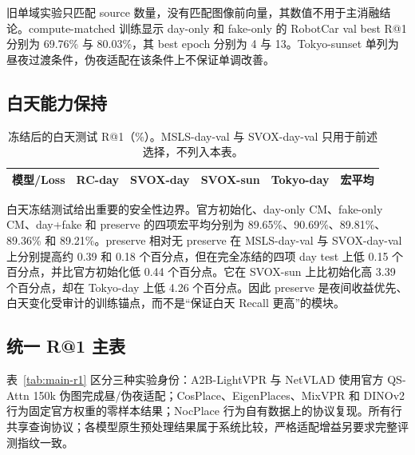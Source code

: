 \documentclass[UTF8,a4paper,11pt]{ctexart}
\begin{document}
旧单域实验只匹配 source 数量，没有匹配图像前向量，其数值不用于主消融结论。compute-matched 训练显示 day-only 和 fake-only 的 RobotCar val best R@1 分别为 69.76\% 与 80.03\%，其 best epoch 分别为 4 与 13。Tokyo-sunset 单列为昼夜过渡条件，伪夜适配在该条件上不保证单调改善。

\subsection{白天能力保持}
\begin{table}[htbp]
\centering
\caption{冻结后的白天测试 R@1（\%）。MSLS-day-val 与 SVOX-day-val 只用于前述选择，不列入本表。}
\label{tab:day-ability}
\begin{tabular}{lrrrrr}
\toprule
模型/Loss & RC-day & SVOX-day & SVOX-sun & Tokyo-day & 宏平均\\
\midrule

\end{tabular}
\end{table}

白天冻结测试给出重要的安全性边界。官方初始化、day-only CM、fake-only CM、day+fake 和 preserve 的四项宏平均分别为 89.65\%、90.69\%、89.81\%、89.36\% 和 89.21\%。preserve 相对无 preserve 在 MSLS-day-val 与 SVOX-day-val 上分别提高约 0.39 和 0.18 个百分点，但在完全冻结的四项 day test 上低 0.15 个百分点，并比官方初始化低 0.44 个百分点。它在 SVOX-sun 上比初始化高 3.39 个百分点，却在 Tokyo-day 上低 4.26 个百分点。因此 preserve 是夜间收益优先、白天变化受审计的训练锚点，而不是“保证白天 Recall 更高”的模块。

\subsection{统一 R@1 主表}
表~\ref{tab:main-r1} 区分三种实验身份：A2B-LightVPR 与 NetVLAD 使用官方 QS-Attn 150k 伪图完成昼/伪夜适配；CosPlace、EigenPlaces、MixVPR 和 DINOv2 行为固定官方权重的零样本结果；NocPlace 行为自有数据上的协议复现。所有行共享查询协议；各模型原生预处理结果属于系统比较，严格适配增益另要求完整评测指纹一致。
\begin{table}[htbp]
\centering
\caption{统一协议 R@1（\%）。MSLS-N 是 validation，Tokyo-S 是 transition；宏平均只含三个独立夜间 test。}
\label{tab:main-r1}
\end{table}
\end{document}
